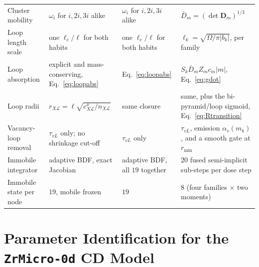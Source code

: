 \documentclass{article}
\begin{document}
\begin{table}[htbp]
\begin{tabular}{p{} p{} p{} p{}}
Cluster mobility & $\omega_i$ for $i,2i,3i$ alike & $\omega_i$ for $i,2i,3i$ alike & $\bar D_m=(\det\bm D_m)^{1/3}$ \\
Loop length scale & one $\ell_c/\ell$ for both habits & one $\ell_c/\ell$ for both habits & $\ell_k=\sqrt{\Omega/\pi|b_k|}$, per family \\
Loop absorption & explicit and mass-conserving, Eq.~\eqref{eq:loopabs} & Eq.~\eqref{eq:loopabs} & $S_k\bar D_m Z_m c_m|m|$, Eq.~\eqref{eq:gdot} \\
Loop radii & $r_{X\mathcal L}=\ell\sqrt{c^x_{X\mathcal L}/n_{X\mathcal L}}$ & same closure & same, plus the bi-pyramid/loop sigmoid, Eq.~\eqref{eq:Rtransition} \\
Vacancy-loop removal & $\tau_{vL}$ only; no shrinkage cut-off & $\tau_{vL}$ only & $\tau_{vL}$, emission $\alpha_v(m_k)$, and a smooth gate at $r_{\min}$ \\
Immobile integrator & adaptive BDF, exact Jacobian & adaptive BDF, all $19$ together & $20$ fused semi-implicit sub-steps per dose step \\
Immobile state per node & $19$, mobile frozen & $19$ & $8$ (four families $\times$ two moments) \\
\hline
\end{tabular}
\end{table}

\section{Parameter Identification for the \texttt{ZrMicro-0d} CD Model} \label{app:B}

\end{document}
